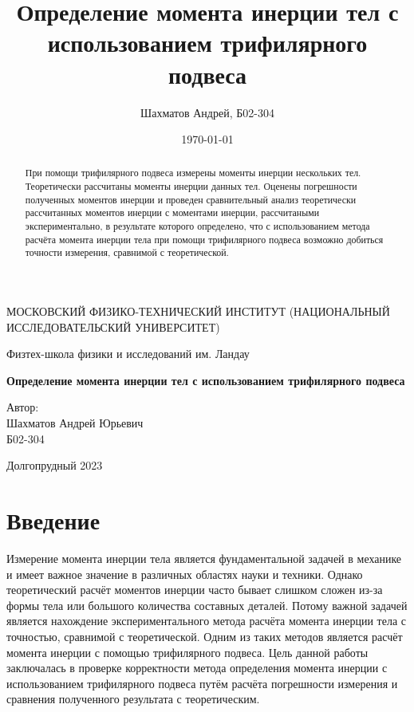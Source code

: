 \documentclass[12pt]{article}
\title{Определение момента инерции тел с использованием трифилярного подвеса}
\author{Шахматов Андрей, Б02-304}
\date{\today}
\begin{document}
\begin{titlepage}
    \begin{center}
        {\large МОСКОВСКИЙ ФИЗИКО-ТЕХНИЧЕСКИЙ ИНСТИТУТ (НАЦИОНАЛЬНЫЙ ИССЛЕДОВАТЕЛЬСКИЙ УНИВЕРСИТЕТ)}
    \end{center}
    \begin{center}
        {\large Физтех-школа физики и исследований им. Ландау}
    \end{center}
    
    
    \vspace{3cm}
    {\huge
        \begin{center}
            \textbf{Определение момента инерции тел с использованием трифилярного подвеса}
        \end{center}
    }
    \vspace{2cm}
    \begin{flushright}
        {\LARGE Автор:\\ Шахматов Андрей Юрьевич \\
            \vspace{0.2cm}
            Б02-304}
    \end{flushright}
    \vspace{7 cm}
    \begin{center}
        Долгопрудный 2023
    \end{center}
\end{titlepage}


\begin{abstract}
    При помощи трифилярного подвеса измерены моменты инерции нескольких тел. Теоретически рассчитаны моменты инерции данных тел. 
    Оценены погрешности полученных моментов инерции и проведен сравнительный анализ теоретически рассчитанных моментов инерции с 
    моментами инерции, рассчитаными экспериментально, в результате которого определено, что с использованием метода расчёта момента инерции тела
    при помощи трифилярного подвеса возможно добиться точности измерения, сравнимой с теоретической.
\end{abstract}

\tableofcontents

\section{Введение}
Измерение момента инерции тела является фундаментальной задачей в механике и имеет важное значение в различных областях науки и техники. 
Однако теоретический расчёт моментов инерции часто бывает слишком сложен из-за формы тела или большого количества составных деталей. 
Потому важной задачей является нахождение экспериментального метода расчёта момента инерции тела с точностью, сравнимой с 
теоретической. Одним из таких методов является расчёт момента инерции с помощью трифилярного подвеса. Цель данной работы заключалась в 
проверке корректности метода определения момента инерции с использованием трифилярного подвеса путём расчёта погрешности измерения и 
сравнения полученного результата с теоретическим.
\end{document}
